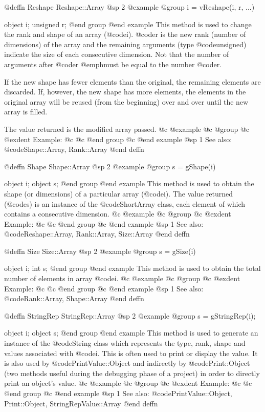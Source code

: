 @deffn {Reshape} Reshape::Array
@sp 2
@example
@group
i = vReshape(i, r, ...)

object     i;
unsigned   r;
@end group
@end example
This method is used to change the rank and shape of an array (@code{i}).
@code{r} is the new rank (number of dimensions) of the array and
the remaining arguments (type @code{unsigned}) indicate the size of
each consecutive dimension.  Not that the number of arguments after
@code{r} @emph{must} be equal to the number @code{r}.

If the new shape has fewer elements than the original, the remaining
elements are discarded.  If, however, the new shape has more elements,
the elements in the original array will be reused (from the beginning)
over and over until the new array is filled.

The value returned is the modified array passed.
@c @example
@c @group
@c @exdent Example:
@c 
@c @end group
@c @end example
@sp 1
See also:  @code{Shape::Array, Rank::Array}
@end deffn







@deffn {Shape} Shape::Array
@sp 2
@example
@group
s = gShape(i)

object  i;
object  s;
@end group
@end example
This method is used to obtain the shape (or dimensions) of a particular
array (@code{i}).  The value returned (@code{s}) is an instance of the
@code{ShortArray} class, each element of which contains a consecutive
dimension.
@c @example
@c @group
@c @exdent Example:
@c 
@c @end group
@c @end example
@sp 1
See also:  @code{Reshape::Array, Rank::Array, Size::Array}
@end deffn








@deffn {Size} Size::Array
@sp 2
@example
@group
s = gSize(i)

object  i;
int     s;
@end group
@end example
This method is used to obtain the total number of elements in array @code{i}.
@c @example
@c @group
@c @exdent Example:
@c 
@c @end group
@c @end example
@sp 1
See also:  @code{Rank::Array, Shape::Array}
@end deffn







@deffn {StringRep} StringRep::Array
@sp 2
@example
@group
s = gStringRep(i);

object  i;
object  s;
@end group
@end example
This method is used to generate an instance of the @code{String} class
which represents the type, rank, shape and values associated with
@code{i}.  This is often used to print or display the value.  It is also
used by @code{PrintValue::Object} and indirectly by @code{Print::Object}
(two methods useful during the debugging phase of a project) in order to
directly print an object's value.
@c @example
@c @group
@c @exdent Example:
@c 
@c @end group
@c @end example
@sp 1
See also:  @code{PrintValue::Object, Print::Object, StringRepValue::Array}
@end deffn






